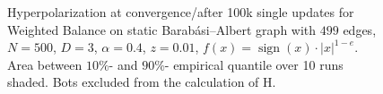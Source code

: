\documentclass[11pt]{article}
\DeclareMathOperator{\sign}{sign}
\begin{document}
\begin{figure}[h!]
\caption{Hyperpolarization at convergence/after 100k single updates for Weighted Balance on static Barabási–Albert graph with $499$ edges,  $N=500$, $D=3$, $\alpha=0.4$, $z=0.01$, $f(x)=\sign(x)\cdot|x|^{1-e}$. Area between $10\%$- and $90\%$- empirical quantile over 10 runs shaded. Bots excluded from the calculation of H.}
\label{bots neutral ba bt}
\end{figure}
\end{document}

